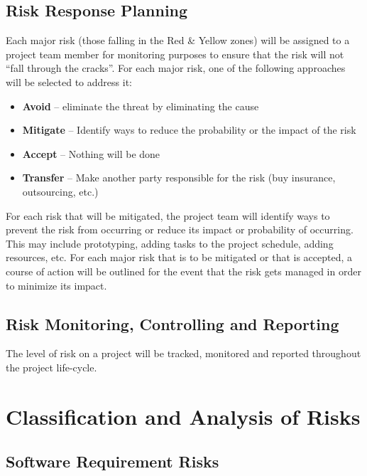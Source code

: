 \documentclass{article}
\begin{document}
\subsection{Risk Response Planning}
Each major risk (those falling in the Red & Yellow zones) will be assigned to a project team member for monitoring purposes to ensure that the risk will not “fall through the cracks”.  
For each major risk, one of the following approaches will be selected to address it:
\begin{itemize}
    \item \textbf{Avoid} – eliminate the threat by eliminating the cause
    \item \textbf{Mitigate} – Identify ways to reduce the probability or the impact of the risk
    \item \textbf{Accept} – Nothing will be done 
    \item \textbf{Transfer} – Make another party responsible for the risk (buy insurance, outsourcing, etc.)
\end{itemize}

For each risk that will be mitigated, the project team will identify ways to prevent the risk from occurring or reduce its impact or probability of occurring.  This may include prototyping, adding tasks to the project schedule, adding resources, etc.
For each major risk that is to be mitigated or that is accepted, a course of action will be outlined for the event that the risk gets managed in order to minimize its impact.
\subsection{Risk Monitoring, Controlling and Reporting}
The level of risk on a project will be tracked, monitored and reported throughout the project life-cycle.  



\newpage

\null\vspace{\fill}
\centering \section{Classification and Analysis of Risks}
\centering \subsection{Software Requirement Risks}
\vspace{\fill}
\newpage
\end{document}
